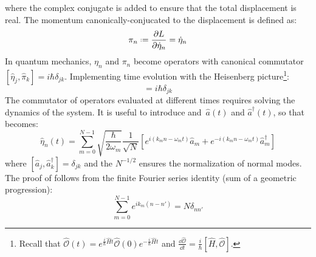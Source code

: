 where the complex conjugate is added to ensure that the total displacement is real. The momentum canonically-conjucated to the displacement is defined as:
\begin{equation}
  \pi_n \defeq \frac{\pa L}{\pa \dot{\eta}_n} = \dot{\eta}_n
\end{equation}
In quantum mechanics, $ \eta_n $ and $ \pi_n $ become operators with canonical commutator $ [ \hat{\eta}_j, \hat{\pi}_k ] = i \hbar \delta_{jk} $. Implementing time evolution with the Heisenberg picture\footnote{Recall that $ \hat{\mathcal{O}}(t) = e^{\frac{i}{\hbar} \hat{H} t} \hat{\mathcal{O}}(0) e^{-\frac{i}{\hbar} \hat{H} t} $ and $ \frac{\dd \hat{\mathcal{O}}}{\dd t} = \frac{i}{\hbar} [ \hat{H}, \hat{\mathcal{O}} ] $.}:
\begin{equation}
  [ \hat{\eta}_j(t), \hat{\pi}_k(t) ] = i \hbar \delta_{jk}
  \label{eq:first-comm}
\end{equation}
The commutator of operators evaluated at different times requires solving the dynamics of the system. It is useful to introduce  and \footnotemark $\, \hat{a}(t) $ and $ \hat{a}^\dagger(t) $, so that  becomes:
%
%
\begin{equation}
  \hat{\eta}_n(t) = \sum_{m = 0}^{N - 1} \sqrt{\frac{\hbar}{2 \omega_m}} \frac{1}{\sqrt{N}} \left[ e^{i \left( k_m n - \omega_m t \right)} \hat{a}_m + e^{-i \left( k_m n - \omega_m t \right)} \hat{a}_m^\dagger \right]
  \label{eq:first-quant}
\end{equation}
where $ [ \hat{a}_j, \hat{a}_k^\dagger ] = \delta_{jk} $ and the $ N^{-1/2} $ ensures the normalization of normal modes. The proof of  follows from the finite Fourier series identity (sum of a geometric progression):
\begin{equation}
  \sum_{m = 0}^{N - 1} e^{i k_m \left( n - n' \right)} = N \delta_{n n'}
  \label{eq:first-id}
\end{equation}

